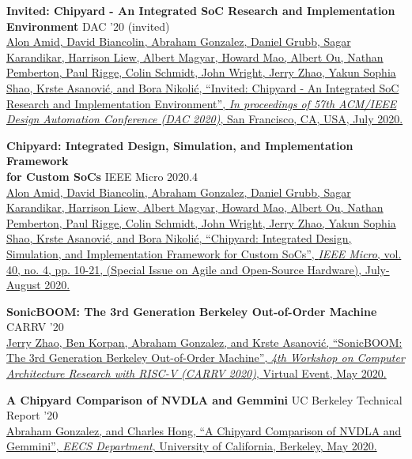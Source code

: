 \documentclass[line]{res}
\begin{document}
\begin{resume}
\textbf{Invited: Chipyard - An Integrated SoC Research and Implementation Environment} \hfill DAC '20 (invited)
\vspace{0.7mm}
\\
\href{https://dl.acm.org/doi/10.5555/3437539.3437682}{Alon Amid, David Biancolin, \underline{Abraham Gonzalez}, Daniel Grubb, Sagar Karandikar, Harrison Liew, Albert Magyar, Howard Mao, Albert Ou, Nathan Pemberton, Paul Rigge, Colin Schmidt, John Wright, Jerry Zhao, Yakun Sophia Shao, Krste Asanovi\'c, and Bora Nikoli\'c, ``Invited: Chipyard - An Integrated SoC Research and Implementation Environment'', \textit{In proceedings of 57th ACM/IEEE Design Automation Conference (DAC 2020)}, San Francisco, CA, USA, July 2020.}
\vspace{-0.8mm}

\textbf{Chipyard: Integrated Design, Simulation, and Implementation Framework\\for Custom SoCs} \hfill IEEE Micro 2020.4
\vspace{0.7mm}
\\
\href{https://dl.acm.org/doi/10.1109/MM.2020.2996616}{Alon Amid, David Biancolin, \underline{Abraham Gonzalez}, Daniel Grubb, Sagar Karandikar, Harrison Liew, Albert Magyar, Howard Mao, Albert Ou, Nathan Pemberton, Paul Rigge, Colin Schmidt, John Wright, Jerry Zhao, Yakun Sophia Shao, Krste Asanovi\'c, and Bora Nikoli\'c, ``Chipyard: Integrated Design, Simulation, and Implementation Framework for Custom SoCs'', \textit{IEEE Micro}, vol. 40, no. 4, pp. 10-21, (Special Issue on Agile and Open-Source Hardware), July-August 2020.}
\vspace{-0.8mm}

\textbf{SonicBOOM: The 3rd Generation Berkeley Out-of-Order Machine} \hfill CARRV '20
\vspace{0.7mm}
\\
\href{https://carrv.github.io/2020/papers/CARRV2020_paper_15_Zhao.pdf}{Jerry Zhao, Ben Korpan, \underline{Abraham Gonzalez}, and Krste Asanovi\'c, ``SonicBOOM: The 3rd Generation Berkeley Out-of-Order Machine'', \textit{4th Workshop on Computer Architecture Research with RISC-V (CARRV 2020)}, Virtual Event, May 2020.}
\vspace{-0.8mm}

\textbf{A Chipyard Comparison of NVDLA and Gemmini} \hfill UC Berkeley Technical Report '20
\vspace{0.7mm}
\\
\href{https://abejgonzalez.github.io/documents/nvdla_v_gemmini.pdf}{\underline{Abraham Gonzalez}, and Charles Hong, ``A Chipyard Comparison of NVDLA and Gemmini'', \textit{EECS Department}, University of California, Berkeley, May 2020.}
\vspace{-0.8mm}


\end{resume}
\end{document}
